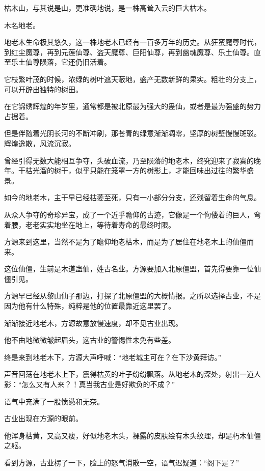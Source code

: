 
\begin{this_body}

枯木山，与其说是山，更准确地说，是一株高耸入云的巨大枯木。

木名地老。

地老木生命极其悠久，这一株地老木已经有一百多万年的历史。从狂蛮魔尊时代，到红尘魔尊，再到元莲仙尊、盗天魔尊、巨阳仙尊，再到幽魂魔尊、乐土仙尊。直至乐土仙尊陨落，它还仍旧活着。

它枝繁叶茂的时候，浓绿的树叶遮天蔽地，盛产无数新鲜的果实。粗壮的分支上，可以开辟出独特的树田。

在它锦绣辉煌的年岁里，通常都是被北原最为强大的蛊仙，或者是最为强盛的势力占据着。

但是伴随着光阴长河的不断冲刷，那苍青的绿意渐渐凋零，坚厚的树壁慢慢斑驳。辉煌逸散，风流沉寂。

曾经引得无数大能相互争夺，头破血流，乃至陨落的地老木，终究迎来了寂寞的晚年。干枯光溜的树干，似乎只能在笼罩一方的树影上，才能回味出过往的繁华盛景。

如今的地老木，主干早已经枯萎至死，只有一小部分分支，还残留着生命的气息。

从众人争夺的奇珍异宝，成了一个近乎瞻仰的古迹，它像是一个佝偻着的巨人，弯着腰，老老实实地坐在地上，等待着寿命的最终时限。

方源来到这里，当然不是为了瞻仰地老枯木，而是为了居住在地老木上的仙僵而来。

这位仙僵，生前是木道蛊仙，姓古名业。方源要加入北原僵盟，首先得要靠一位仙僵引见。

方源早已经从黎山仙子那边，打探了北原僵盟的大概情报。之所以选择古业，不是因为他有什么特殊，纯粹是他的位置最靠近这里罢了。

渐渐接近地老木，方源故意放慢速度，却不见古业出现。

他不由地微微皱起眉头，这古业的警惕性未免有些差。

终是来到地老木下，方源大声呼喊：“地老城主可在？在下沙黄拜访。”

声音回荡在地老木上下，震得枯黄的叶子纷纷飘落。从地老木的深处，射出一道人影：“怎么又有人来？！真当我古业是好欺负的不成？”

语气中充满了一股愤懑和无奈。

古业出现在方源的眼前。

他浑身枯黄，又高又瘦，好似地老木头，裸露的皮肤绘有木头纹理，却是朽木仙僵之躯。

看到方源，古业楞了一下，脸上的怒气消散一空，语气迟疑道：“阁下是？”


\end{this_body}
